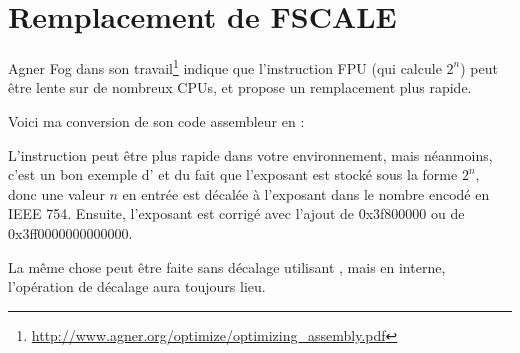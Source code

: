 \section{Remplacement de FSCALE}

Agner Fog dans son travail\footnote{\url{http://www.agner.org/optimize/optimizing_assembly.pdf}}
indique que l'instruction \ac{FPU}  (qui calcule $2^n$) peut être lente
sur de nombreux CPUs, et propose un remplacement plus rapide.

Voici ma conversion de son code assembleur en \CCpp:



L'instruction peut être plus rapide dans votre environnement, mais néanmoins,
c'est un bon exemple d' et du fait que l'exposant est stocké sous la forme
$2^n$, donc une valeur $n$ en entrée est décalée à l'exposant dans le nombre encodé
en IEEE 754.
Ensuite, l'exposant est corrigé avec l'ajout de 0x3f800000 ou de 0x3ff0000000000000.

La même chose peut être faite sans décalage utilisant , mais en interne,
l'opération de décalage aura toujours lieu.

